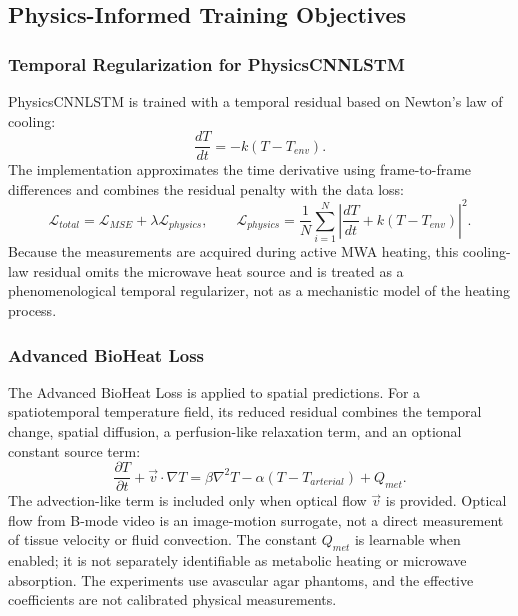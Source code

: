 

\subsection{Physics-Informed Training Objectives}

\subsubsection{Temporal Regularization for PhysicsCNNLSTM}
PhysicsCNNLSTM is trained with a temporal residual based on Newton's law of
cooling:
\begin{equation}
    \frac{dT}{dt} = -k(T - T_{env}).
\end{equation}
The implementation approximates the time derivative using frame-to-frame
differences and combines the residual penalty with the data loss:
\begin{equation}
    \mathcal{L}_{total} =
    \mathcal{L}_{MSE} + \lambda\mathcal{L}_{physics},\qquad
    \mathcal{L}_{physics} =
    \frac{1}{N}\sum_{i=1}^{N}
    \left|\frac{dT}{dt}+k(T-T_{env})\right|^2.
\end{equation}
Because the measurements are acquired during active MWA heating, this
cooling-law residual omits the microwave heat source and is treated as a
phenomenological temporal regularizer, not as a mechanistic model of the
heating process.

\subsubsection{Advanced BioHeat Loss}
The Advanced BioHeat Loss is applied to spatial predictions. For a
spatiotemporal temperature field, its reduced residual combines the temporal
change, spatial diffusion, a perfusion-like relaxation term, and an optional
constant source term:
\begin{equation}
    \frac{\partial T}{\partial t}
    + \vec{v}\cdot\nabla T
    = \beta\nabla^2 T
    - \alpha(T-T_{arterial}) + Q_{met}.
\end{equation}
The advection-like term is included only when optical flow $\vec{v}$ is
provided. Optical flow from B-mode video is an image-motion surrogate, not a
direct measurement of tissue velocity or fluid convection. The constant
$Q_{met}$ is learnable when enabled; it is not separately identifiable as
metabolic heating or microwave absorption. The experiments use avascular agar
phantoms, and the effective coefficients are not calibrated physical
measurements.

